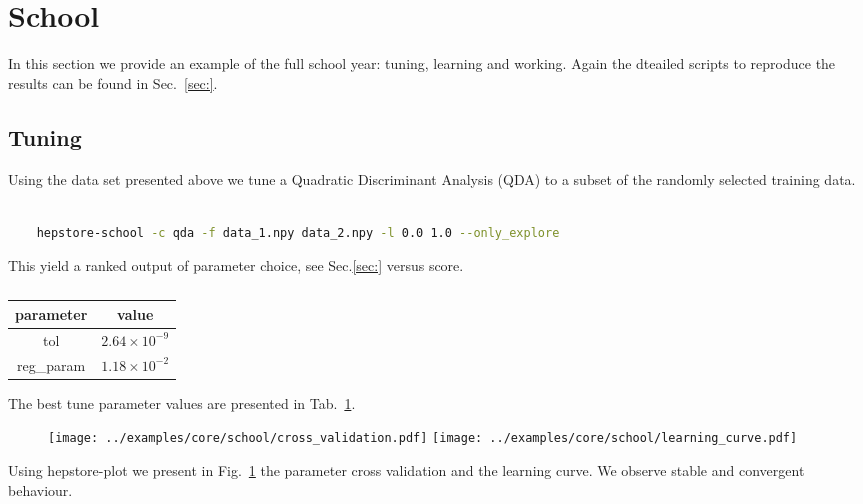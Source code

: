 
\section{School}

In this section we provide an example of the full school year: tuning,
learning and working. Again the dteailed scripts to reproduce the
results can be found in Sec.~\ref{sec:}.

\subsection{Tuning}
Using the data set presented above we tune a Quadratic Discriminant
Analysis (QDA) to a subset of the randomly selected training data.
%
\begin{changemargin}{1.5cm}{1.5cm} 
  \begin{lstlisting}[language=Bash]
    
    hepstore-school -c qda -f data_1.npy data_2.npy -l 0.0 1.0 --only_explore
  \end{lstlisting}
\end{changemargin}
%
This yield a ranked output of parameter choice, see Sec.\ref{sec:}
versus score.
\begin{table}[h!]
  \centering
  \begin{tabular}{c|c}
    parameter & value \\
    \hline \hline
    tol       & $2.64\times10^{-9}$ \\
    reg\_param& $1.18\times10^{-2}$\\
    \hline
    \end{tabular}
  \caption{}
  \label{tab:example_tuning}
\end{table}
%
The best tune parameter values are presented in
Tab.~\ref{tab:example_tuning}.
%
\begin{figure}
  \centering
  \texttt{[image: ../examples/core/school/cross\_validation.pdf]}
  \texttt{[image: ../examples/core/school/learning\_curve.pdf]}
  \caption{}
  \label{fig:example_tuning}
\end{figure}
%
Using hepstore-plot we present in Fig.~\ref{fig:example_tuning} the
parameter cross validation and the learning curve. We observe stable
and convergent behaviour.

